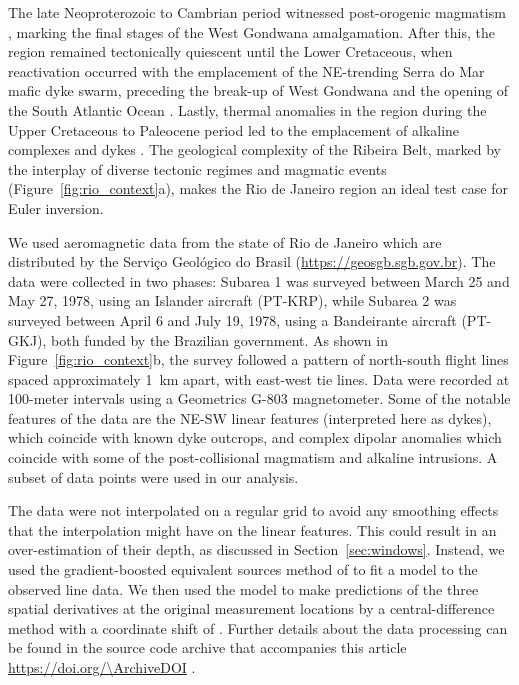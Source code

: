 The late Neoproterozoic to Cambrian period witnessed post-orogenic magmatism
\citep[\textit{e.g.,}][]{Valeriano2011}, marking the final stages of the West
Gondwana amalgamation. After this, the region remained tectonically quiescent
until the Lower Cretaceous, when reactivation occurred with the emplacement of
the NE-trending Serra do Mar mafic dyke swarm, preceding the break-up of West
Gondwana and the opening of the South Atlantic Ocean \citep{Almeida2013}.
Lastly, thermal anomalies in the region during the Upper Cretaceous to
Paleocene period led to the emplacement of alkaline complexes and dykes
\citep{Thompson1998}.
The geological complexity of the Ribeira Belt, marked by the interplay of diverse tectonic
regimes and magmatic events (Figure~\ref{fig:rio_context}a), makes the Rio de Janeiro
region an ideal test case for Euler inversion.

We used aeromagnetic data from the state of Rio de Janeiro which are distributed by the Serviço Geológico do Brasil (\url{https://geosgb.sgb.gov.br}).
The data were collected in two phases: Subarea 1 was surveyed between March 25 and May 27, 1978, using
an Islander aircraft (PT-KRP), while Subarea 2 was surveyed between April 6 and
July 19, 1978, using a Bandeirante aircraft (PT-GKJ), both funded by the
Brazilian government.
As shown in Figure~\ref{fig:rio_context}b, the survey followed a pattern of north-south flight lines spaced approximately \qty{1}{\km} apart, with east-west tie lines.
Data were recorded at 100-meter intervals using a Geometrics G-803 magnetometer.
Some of the notable features of the data are the NE-SW linear features (interpreted here as dykes), which coincide with known dyke outcrops, and complex dipolar anomalies which coincide with some of the post-collisional magmatism and alkaline intrusions.
A subset of \RioNData{} data points were used in our analysis.

The data were not interpolated on a regular grid to avoid any smoothing effects that the interpolation might have on the linear features.
This could result in an over-estimation of their depth, as discussed in Section~\ref{sec:windows}.
Instead, we used the gradient-boosted equivalent sources method of \citet{Soler2021} to fit a model to the observed line data.
We then used the model to make predictions of the three spatial derivatives at the original measurement locations by a central-difference method with a coordinate shift of \RioDerivSpacing{}.
Further details about the data processing can be found in the source code archive that accompanies this article \url{https://doi.org/\ArchiveDOI} \citep{figshare}.

